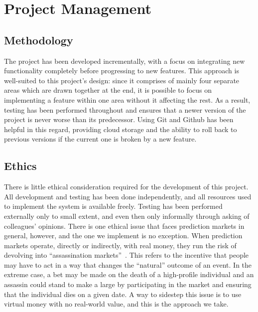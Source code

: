 \section{Project Management}

\label{sec:projectManagement}

\subsection{Methodology}

The project has been developed incrementally, with a focus on integrating new
functionality completely before progressing to new features. This approach is
well-suited to this project's design: since it comprises of mainly four
separate areas which are drawn together at the end, it is possible to focus on
implementing a feature within one area without it affecting the rest. As a
result, testing has been performed throughout and ensures that a newer version
of the project is never worse than its predecessor. Using Git and Github has
been helpful in this regard, providing cloud storage and the ability to roll
back to previous versions if the current one is broken by a new feature.

\subsection{Ethics}

There is little ethical consideration required for the development of this
project. All development and testing has been done independently, and all
resources used to implement the system is available freely. Testing has been
performed externally only to small extent, and even then only informally
through asking of colleagues' opinions. There is one ethical issue that faces
prediction markets in general, however, and the one we implement is no
exception. When prediction markets operate, directly or indirectly, with real
money, they run the risk of devolving into ``assassination
markets''~\cite{assassinationMarkets, crowdfundingMurder}. This refers to the
incentive that people may have to act in a way that changes the ``natural''
outcome of an event. In the extreme case, a bet may be made on the death of a
high-profile individual and an assassin could stand to make a large by
participating in the market and ensuring that the individual dies on a given
date. A way to sidestep this issue is to use virtual money with no real-world
value, and this is the approach we take.


